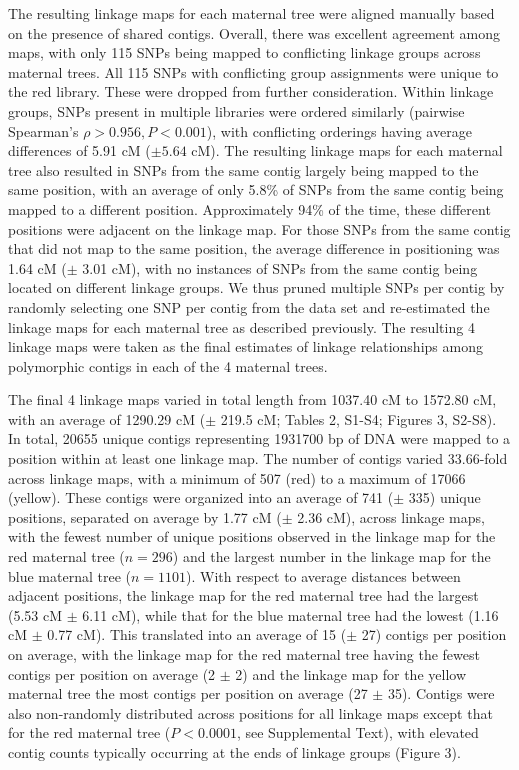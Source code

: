 \documentclass[smallextended]{svjour3}
\begin{document}
The resulting linkage maps for each maternal tree were aligned manually based on the presence of shared contigs. Overall, there
was excellent agreement among maps, with only 115 SNPs being mapped to conflicting linkage groups across maternal trees. All 115
SNPs with conflicting group assignments were unique to the red library. These were dropped from further consideration. 
Within linkage groups, SNPs present in multiple libraries were ordered similarly (pairwise Spearman's $\rho > 0.956, 
P < 0.001$), with conflicting orderings having average differences of \num{5.91} cM ($\pm 5.64$ cM). The resulting linkage maps for each maternal tree also
resulted in SNPs from the same contig largely being mapped to the same position, with an average of only 5.8\% of SNPs 
from the same contig being mapped to a different position. 
Approximately 94\% of the time, these different positions were adjacent on the linkage map. For those SNPs from the same contig that
did not map to the same position, the average difference in positioning was 1.64 cM ($\pm$ 3.01 cM), with no instances 
of SNPs from the same contig being located on different linkage groups. We thus pruned multiple SNPs per contig by randomly
selecting one SNP per contig from the data set and re-estimated the linkage maps for each maternal tree as described previously. 
The resulting \num{4} linkage maps were taken as the final estimates of linkage relationships among polymorphic contigs 
in each of the \num{4} maternal trees.

The final \num{4} linkage maps varied in total length from 1037.40 cM to 1572.80 cM, with an average of 1290.29 cM ($\pm$ 219.5 cM; Tables 2, S1-S4; Figures 3, S2-S8). 
In total, \num{20655} unique contigs representing \num{1931700} bp of DNA were mapped to a position within at least one linkage map. 
The number of contigs varied 33.66-fold across linkage maps, with a minimum of 507 (red) to a maximum of \num{17066} (yellow). 
These contigs were organized into an average of 741 ($\pm$ 335) unique positions, separated on average
by 1.77 cM ($\pm$ 2.36 cM), across linkage maps, with the fewest number of unique positions observed 
in the linkage map for the red maternal tree ($n = 296$) and the largest number in the linkage map for the blue maternal 
tree ($n = 1101$). With respect to average distances between adjacent positions, the linkage map for the red 
maternal tree had the largest (5.53 cM $\pm$ 6.11 cM), while that for the blue maternal tree had the lowest (1.16 cM $\pm$ 0.77 cM).
This translated into an average of 15 ($\pm$ 27) contigs per position on average, with the linkage map for the red maternal tree
having the fewest contigs per position on average (2 $\pm$ 2) and the linkage map for the yellow maternal tree the most contigs
per position on average (27 $\pm$ 35). Contigs were also non-randomly distributed across positions for all linkage maps except that
for the red maternal tree ($P < 0.0001$, see Supplemental Text), with elevated contig counts typically occurring at the ends of linkage groups (Figure 3).
\end{document}
